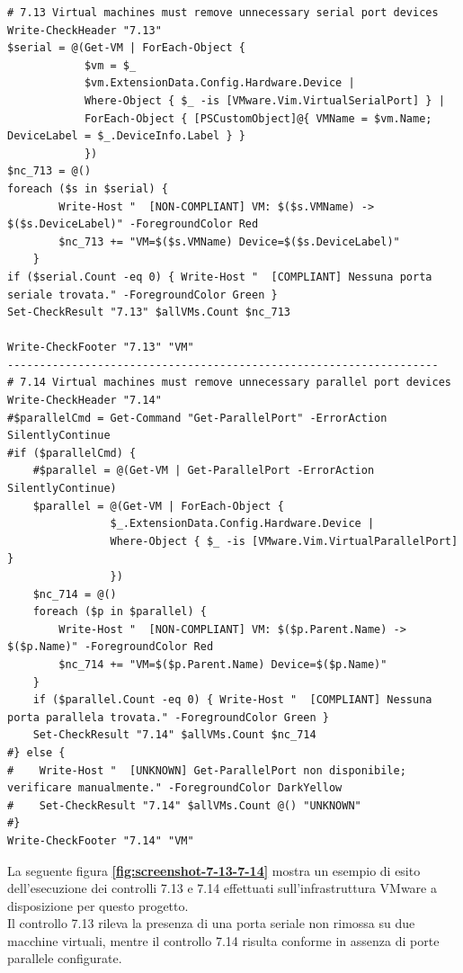 \documentclass[a4paper,11pt]{report}
\begin{document}
\begin{lstlisting}[style=azcli, caption={Rilevamento di porte seriali e parallele tramite \texttt{ExtensionData} per i controlli 7.13 e 7.14}, label={lst:serial-parallel-check}]
# 7.13 Virtual machines must remove unnecessary serial port devices
Write-CheckHeader "7.13"
$serial = @(Get-VM | ForEach-Object {
            $vm = $_
            $vm.ExtensionData.Config.Hardware.Device |
            Where-Object { $_ -is [VMware.Vim.VirtualSerialPort] } |
            ForEach-Object { [PSCustomObject]@{ VMName = $vm.Name; DeviceLabel = $_.DeviceInfo.Label } }
            })            
$nc_713 = @()
foreach ($s in $serial) {
        Write-Host "  [NON-COMPLIANT] VM: $($s.VMName) -> $($s.DeviceLabel)" -ForegroundColor Red
        $nc_713 += "VM=$($s.VMName) Device=$($s.DeviceLabel)"
    }
if ($serial.Count -eq 0) { Write-Host "  [COMPLIANT] Nessuna porta seriale trovata." -ForegroundColor Green }
Set-CheckResult "7.13" $allVMs.Count $nc_713

Write-CheckFooter "7.13" "VM"
-------------------------------------------------------------------
# 7.14 Virtual machines must remove unnecessary parallel port devices 
Write-CheckHeader "7.14" 
#$parallelCmd = Get-Command "Get-ParallelPort" -ErrorAction SilentlyContinue
#if ($parallelCmd) {
    #$parallel = @(Get-VM | Get-ParallelPort -ErrorAction SilentlyContinue)
    $parallel = @(Get-VM | ForEach-Object {
                $_.ExtensionData.Config.Hardware.Device |
                Where-Object { $_ -is [VMware.Vim.VirtualParallelPort] }
                })
    $nc_714 = @()
    foreach ($p in $parallel) {
        Write-Host "  [NON-COMPLIANT] VM: $($p.Parent.Name) -> $($p.Name)" -ForegroundColor Red
        $nc_714 += "VM=$($p.Parent.Name) Device=$($p.Name)"
    }
    if ($parallel.Count -eq 0) { Write-Host "  [COMPLIANT] Nessuna porta parallela trovata." -ForegroundColor Green }
    Set-CheckResult "7.14" $allVMs.Count $nc_714
#} else {
#    Write-Host "  [UNKNOWN] Get-ParallelPort non disponibile; verificare manualmente." -ForegroundColor DarkYellow
#    Set-CheckResult "7.14" $allVMs.Count @() "UNKNOWN"
#}
Write-CheckFooter "7.14" "VM"
\end{lstlisting}



La seguente figura \textbf{\ref{fig:screenshot-7-13-7-14}} mostra un esempio di esito dell'esecuzione dei controlli 7.13 e 7.14 effettuati sull'infrastruttura VMware a disposizione per questo progetto. \\
Il controllo 7.13 rileva la presenza di una porta seriale non rimossa su due macchine virtuali, mentre il controllo 7.14 risulta conforme in assenza di porte parallele configurate.
\end{document}
